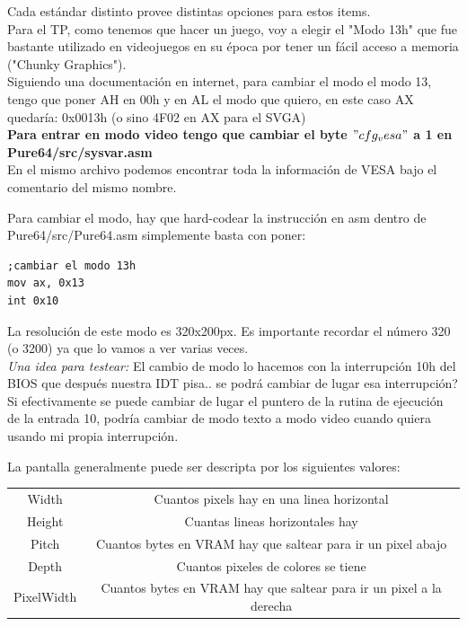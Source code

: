 \documentclass[]{article}
\begin{document}
Cada est\'andar distinto provee distintas opciones para estos items.\\

Para el TP, como tenemos que hacer un juego, voy a elegir el "Modo 13h" que fue bastante utilizado en videojuegos en su \'epoca por tener un f\'acil acceso a memoria ("Chunky Graphics").\\

Siguiendo una documentaci\'on en internet, para cambiar el modo el modo 13, tengo que poner AH en 00h y en AL el modo que quiero, en este caso AX quedar\'ia: 0x0013h (o sino 4F02 en AX para el SVGA) \\

\textbf{Para entrar en modo video tengo que cambiar el byte $"cfg_vesa"$ a 1 en Pure64/src/sysvar.asm}\\

En el mismo archivo podemos encontrar toda la informaci\'on de VESA bajo el comentario del mismo nombre.

Para cambiar el modo, hay que hard-codear la instrucci\'on en asm dentro de Pure64/src/Pure64.asm simplemente basta con poner:

\begin{verbatim}
;cambiar el modo 13h
mov ax, 0x13
int 0x10

\end{verbatim}

La resoluci\'on de este modo es 320x200px. Es importante recordar el n\'umero 320 (o 3200) ya que lo vamos a ver varias veces.\\

\textit{Una idea para testear:} El cambio de modo lo hacemos con la interrupci\'on 10h del BIOS que despu\'es nuestra IDT pisa.. se podr\'a cambiar de lugar esa interrupci\'on? Si efectivamente se puede cambiar de lugar el puntero de la rutina de ejecuci\'on de la entrada 10, podr\'ia cambiar de modo texto a modo video cuando quiera usando mi propia interrupci\'on.

La pantalla generalmente puede ser descripta por los siguientes valores:\\

\begin{tabular}{ |c|c|}
	\hline
	Width & Cuantos pixels hay en una linea horizontal\\
	Height & Cuantas lineas horizontales hay\\
	Pitch & Cuantos bytes en VRAM hay que saltear para ir un pixel abajo\\
	Depth & Cuantos pixeles de colores se tiene\\
	PixelWidth &  Cuantos bytes en VRAM hay que saltear para ir un pixel a la derecha\\
	\hline
\end{tabular}
\end{document}
